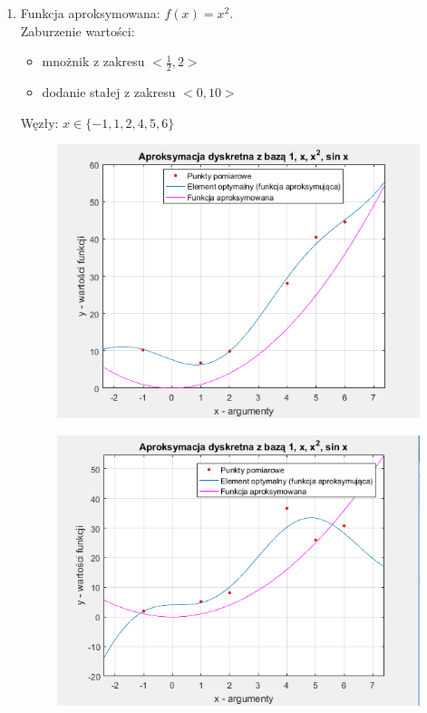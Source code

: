 \documentclass[12pt]{article}
\begin{document}
	
	\begin{enumerate}[label=\textbf{Przykład \arabic*}]
		\item
		Funkcja aproksymowana: $f(x) = x^2$.\\
		Zaburzenie wartości:
		\begin{itemize}
			\item mnożnik z zakresu $<\frac{1}{2}, 2>$
			\item dodanie stałej z zakresu $<0, 10>$
		\end{itemize}
		Węzły: $x \in \{-1, 1, 2, 4, 5, 6\}$
		
		\begin{figure}[H]
			\centering
			\includegraphics[scale=0.8]{images/example-1a.png}
		\end{figure}
	
		\begin{figure}[H]
			\centering
			\includegraphics[scale=0.8]{images/example-1b.png}
		\end{figure}
	

\end{enumerate}
\end{document}
